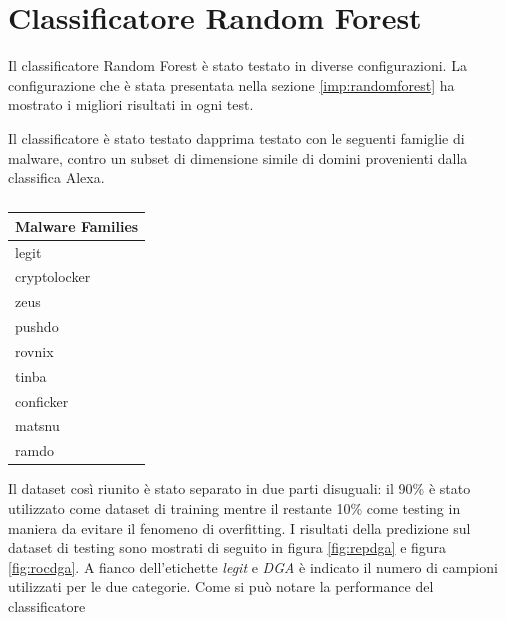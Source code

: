 \section{Classificatore Random Forest}
\label{res:crf}
Il classificatore Random Forest è stato testato in diverse configurazioni. La configurazione che è stata presentata nella sezione \ref{imp:randomforest} ha mostrato i migliori risultati in ogni test.

Il classificatore è stato testato dapprima testato con le seguenti famiglie di malware, contro un subset di dimensione simile di domini provenienti dalla classifica Alexa.

\begin{table}[!ht]
    \centering
    \begin{tabular}[t]{l}
    \toprule
    Malware Families \\
    \midrule
legit \\
cryptolocker \\
zeus \\
pushdo \\
rovnix \\
tinba \\
conficker \\
matsnu \\
ramdo \\
\bottomrule
\end{tabular}
\caption{\label{tab:malware}}
\end{table}

Il dataset così riunito è stato separato in due parti disuguali: il 90\% è stato utilizzato come dataset di training mentre il restante 10\% come testing in maniera da evitare il fenomeno di overfitting. I risultati della predizione sul dataset di testing sono mostrati di seguito in figura \ref{fig:repdga} e figura \ref{fig:rocdga}. A fianco dell'etichette \textit{legit} e \textit{DGA} è indicato il numero di campioni utilizzati per le due categorie. Come si può notare la performance del classificatore

